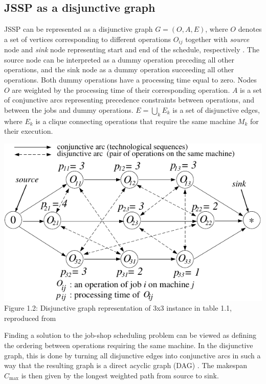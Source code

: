 \subsection{JSSP as a disjunctive graph} \label{JSSP as a disjunctive graph}

JSSP can be represented as a disjunctive graph $G = ( O, A, E )$, where $O$ denotes a set of vertices corresponding to different operations $O_{ij}$ together with \textit{source} node and \textit{sink} node representing start and end of the schedule, respectively \cite{YamadaNakanoJSSP, BLAZEWICZ2000317}. The source node can be interpreted as a dummy operation preceding all other operations, and the sink node as a dummy operation succeeding all other operations. Both dummy operations have a processing time equal to zero. Nodes $O$ are weighted by the processing time of their corresponding operation. $A$ is a set of conjunctive arcs representing precedence constraints between operations, and between the jobs and dummy operations. $E = \bigcup_{k} E_k$ is a set of disjunctive edges, where $E_k$ is a clique connecting operations that require the same machine $M_k$ for their execution.
\begin{center}
    \includegraphics[width=0.75\linewidth]{images/jssp_disjunctive_graph.pdf}\\
    Figure 1.2: Disjunctive graph representation of 3x3 instance in table 1.1, reproduced from \cite{YamadaNakanoJSSP}
\end{center}

Finding a solution to the job-shop scheduling problem can be viewed as defining the ordering between operations requiring the same machine. In the disjunctive graph, this is done by turning all disjunctive edges into conjunctive arcs \cite{YamadaNakanoJSSP, BLAZEWICZ2000317} in such a way that the resulting graph is a direct acyclic graph (DAG) \cite{doi:10.1287/opre.17.6.941}. The makespan $C_\text{max}$ is then given by the longest weighted path from source to sink.

